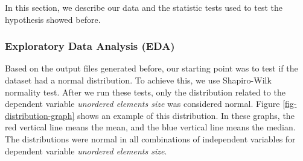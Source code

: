 In this section, we describe our data and the statistic tests used to test the hypothesis showed before.

\subsubsection{Exploratory Data Analysis (EDA)}

Based on the output files generated before, our starting point was to test if the dataset had a normal distribution. To achieve this, we use Shapiro-Wilk normality test. After we run these tests, only the distribution related to the dependent variable \textit{unordered elements size} was considered normal. Figure \ref{fig-distribution-graph} shows an example of this distribution. In these graphs, the red vertical line means the mean, and the blue vertical line means the median. The distributions were normal in all combinations of independent variables for dependent variable \textit{unordered elements size}.

